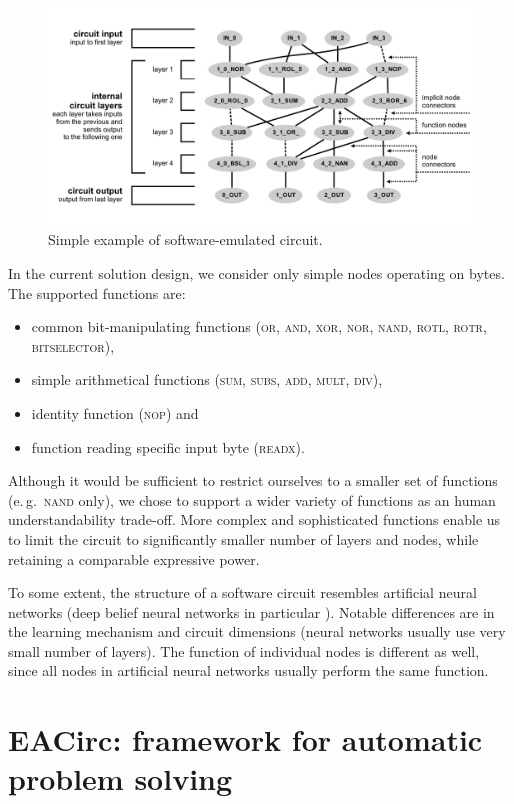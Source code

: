\documentclass[12pt,oneside]{fithesis2}
\newcommand{\squarebullet}{\textcolor{black}{\raisebox{0.15em}{\rule{4pt}{4pt}}}}
\newenvironment{myItemize}{
  \begin{itemize}[leftmargin=2em,rightmargin=1em,itemsep=\parskip ,parsep=0em,topsep=0em,partopsep=0em]
  \renewcommand{\labelitemi}{\squarebullet}
  \renewcommand{\labelitemii}{$\diamond$}
}{
  \end{itemize}
}
\begin{document}
\begin{figure}[t!]
\centering
\includegraphics[width=\textwidth]{images/circuit-final}
\caption{Simple example of software-emulated circuit.}
\label{fig:circuit-example}
\end{figure}

In the current solution design, we consider only simple nodes operating on bytes. The supported functions are:
\begin{myItemize}
\item common bit-manipulating functions (\textsc{or, and, xor, nor, nand, rotl, rotr, bitselector}),
\item simple arithmetical functions (\textsc{sum, subs, add, mult, div}),
\item identity function (\textsc{nop}) and
\item function reading specific input byte (\textsc{readx}).
\end{myItemize}

\noindent
Although it would be sufficient to restrict ourselves to a smaller set of functions (e.\,g.\ \textsc{nand} only),
we chose to support a wider variety of functions as an human understandability trade-off.
More complex and sophisticated functions enable us to limit the circuit to significantly smaller number of layers and nodes,
while retaining a comparable expressive power.

To some extent, the structure of a software circuit resembles artificial neural networks 
(deep belief neural networks in particular \parencite{neural-networks}). Notable differences are in
the learning mechanism and circuit dimensions (neural networks usually use very small number of layers). 
The function of individual nodes is different as well, since all nodes in artificial neural networks usually perform the same function.

\section{EACirc: framework for automatic problem solving}
\label{sec:eacirc-principles}
\end{document}
